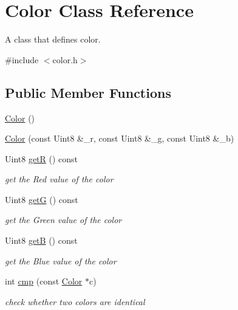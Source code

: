 \hypertarget{class_color}{}\section{Color Class Reference}
\label{class_color}


A class that defines color.  




{\ttfamily \#include $<$color.\+h$>$}

\subsection*{Public Member Functions}
\begin{DoxyCompactItemize}
\item 
\mbox{\hyperlink{class_color_a9a742cbe9f9f4037f5d9f4e81a9b2428}{Color}} ()
\item 
\mbox{\hyperlink{class_color_ae9ef762fa628be655fef146879922545}{Color}} (const Uint8 \&\+\_\+r, const Uint8 \&\+\_\+g, const Uint8 \&\+\_\+b)
\item 
Uint8 \mbox{\hyperlink{class_color_aecb6487557d6eb8386d1a11c37b026fb}{getR}} () const
\begin{DoxyCompactList}\small\item\em get the Red value of the color \end{DoxyCompactList}\item 
Uint8 \mbox{\hyperlink{class_color_a50f526c1152871f13d2285f1d52e72db}{getG}} () const
\begin{DoxyCompactList}\small\item\em get the Green value of the color \end{DoxyCompactList}\item 
Uint8 \mbox{\hyperlink{class_color_a3121cb39d8669ea8cddbcfbbcc735e3f}{getB}} () const
\begin{DoxyCompactList}\small\item\em get the Blue value of the color \end{DoxyCompactList}\item 
int \mbox{\hyperlink{class_color_ad6cf831bb3384fb165ec681b40899049}{cmp}} (const \mbox{\hyperlink{class_color}{Color}} $\ast$c)
\begin{DoxyCompactList}\small\item\em check whether two colors are identical \end{DoxyCompactList}\end{DoxyCompactItemize}



